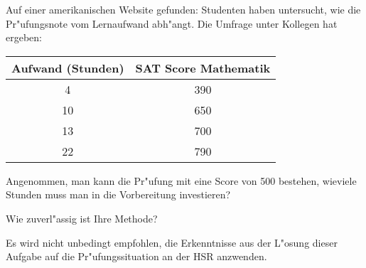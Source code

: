 Auf einer amerikanischen Website gefunden: Studenten haben untersucht,
wie die Pr"ufungsnote vom Lernaufwand abh"angt.
Die Umfrage unter Kollegen hat ergeben:
\begin{center}
\begin{tabular}{c|c}
Aufwand (Stunden)&SAT Score Mathematik\\
\hline
4&390\\
10&650\\
13&700\\
22&790
\end{tabular}
\end{center}
\begin{teilaufgaben}
\item
Angenommen, man kann die Pr"ufung mit eine Score von 500 bestehen, 
wieviele Stunden muss man in die Vorbereitung investieren?
\item
Wie zuverl"assig ist Ihre Methode?
\end{teilaufgaben}

\begin{hinweis}
Es wird nicht unbedingt empfohlen, die Erkenntnisse aus der
L"osung dieser Aufgabe auf die Pr"ufungssituation an der HSR anzwenden.
\end{hinweis}

